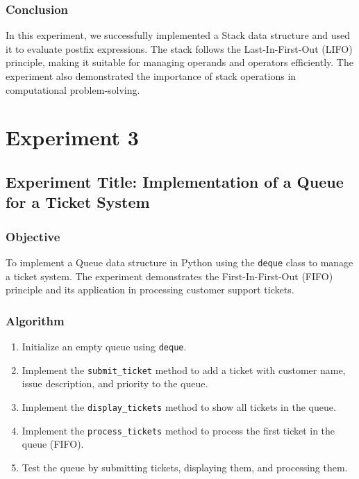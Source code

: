 \documentclass[a4paper,12pt]{article}
\begin{document}
\subsubsection*{Conclusion}
In this experiment, we successfully implemented a Stack data structure and used it to evaluate postfix expressions. The stack follows the Last-In-First-Out (LIFO) principle, making it suitable for managing operands and operators efficiently. The experiment also demonstrated the importance of stack operations in computational problem-solving.

\clearpage

\section*{ Experiment 3}
\label{sec:exp3}
\subsection*{Experiment Title: Implementation of a Queue for a Ticket System}

\subsubsection*{Objective}
To implement a Queue data structure in Python using the \texttt{deque} class to manage a ticket system. The experiment demonstrates the First-In-First-Out (FIFO) principle and its application in processing customer support tickets.

\subsubsection*{Algorithm}
\begin{enumerate}
    \item Initialize an empty queue using \texttt{deque}.
    \item Implement the \texttt{submit\_ticket} method to add a ticket with customer name, issue description, and priority to the queue.
    \item Implement the \texttt{display\_tickets} method to show all tickets in the queue.
    \item Implement the \texttt{process\_tickets} method to process the first ticket in the queue (FIFO).
    \item Test the queue by submitting tickets, displaying them, and processing them.
\end{enumerate}
\end{document}

